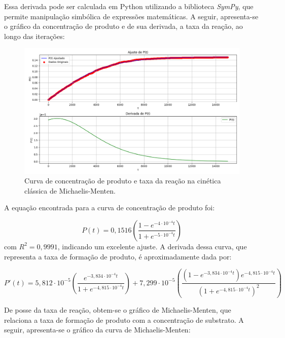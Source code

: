 \documentclass[12pt,oneside]{report}
\begin{document}
Essa derivada pode ser calculada em Python utilizando a biblioteca \textit{SymPy}, que permite manipulação simbólica de expressões matemáticas. A seguir, apresenta-se o gráfico da concentração de produto e de sua derivada, a taxa da reação, ao longo das iterações:

\begin{figure}[H]
    \centering
    \includegraphics[width=1\textwidth]{MM_rate.png}
    \caption{\small Curva de concentração de produto e taxa da reação na cinética clássica de Michaelis-Menten.}
    \label{fig:MM_rate}
\end{figure}

A equação encontrada para a curva de concentração de produto foi:

\begin{equation}
    P(t) = 0{,}1516 \left(\frac{1 - e^{-4 \cdot 10^{-4} t}}{1 + e^{-5 \cdot 10^{-4} t}}\right)
\end{equation}
com $R^2 = 0{,}9991$, indicando um excelente ajuste. A derivada dessa curva, que representa a taxa de formação de produto, é aproximadamente dada por:

\begin{equation}
    P'(t) = 5{,}812 \cdot 10^{-5} \left(\frac{e^{-3{,}834 \cdot 10^{-4} t}}{1 + e^{-4{,}815 \cdot 10^{-4} t}}\right) + 7{,}299 \cdot 10^{-5} \left(\frac{(1 - e^{-3{,}834 \cdot 10^{-4} t}) e^{-4{,}815 \cdot 10^{-4} t}}{(1 + e^{-4{,}815 \cdot 10^{-4} t})^2}\right)
\end{equation}

De posse da taxa de reação, obtem-se o gráfico de Michaelis-Menten, que relaciona a taxa de formação de produto com a concentração de substrato. A seguir, apresenta-se o gráfico da curva de Michaelis-Menten:
\end{document}
